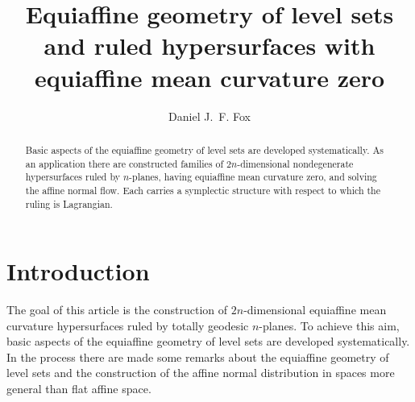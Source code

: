 \documentclass [leqno, 10pt]{amsart}
\theoremstyle{definition}
\numberwithin{equation}{section}
\begin{document}
\title[Equiaffine geometry of level sets]{Equiaffine geometry of level sets and ruled hypersurfaces with equiaffine mean curvature zero}
\author{Daniel J.~F. Fox} 
\address{Escuela T\'ecnica Superior de Ingenier\'ia y Dise\~no Industrial\\ Universidad Polit\'ecnica de Madrid\\Ronda de Valencia 3\\ 28012 Madrid Espa\~na}


\begin{abstract}
Basic aspects of the equiaffine geometry of level sets are developed systematically. 
As an application there are constructed families of $2n$-dimensional nondegenerate hypersurfaces ruled by $n$-planes, having equiaffine mean curvature zero, and solving the affine normal flow. Each carries a symplectic structure with respect to which the ruling is Lagrangian. 
\end{abstract}

\maketitle

\section{Introduction}
The goal of this article is the construction of $2n$-dimensional equiaffine mean curvature hypersurfaces ruled by totally geodesic $n$-planes. To achieve this aim, basic aspects of the equiaffine geometry of level sets are developed systematically. In the process there are made some remarks about the equiaffine geometry of level sets and the construction of the affine normal distribution in spaces more general than flat affine space. 
\end{document}
